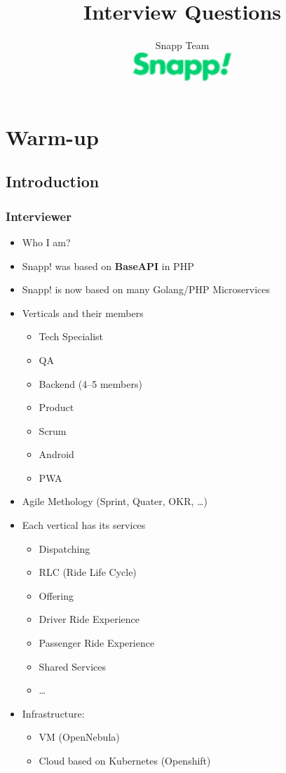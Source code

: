 \documentclass[]{book}
\begin{document}
\title{Interview Questions}
\author{%
  Snapp Team \\[1cm]
  \includegraphics[width=10em]{./snapp.png}
}

\maketitle

\chapter{Warm-up}

\section{Introduction}

\subsection{Interviewer}
\begin{itemize}
  \item Who I am?
  \item Snapp! was based on \textbf{BaseAPI} in PHP
  \item Snapp! is now based on many Golang/PHP Microservices
  \item Verticals and their members
    \begin{itemize}
      \item Tech Specialist
      \item QA
      \item Backend (4--5 members)
      \item Product
      \item Scrum
      \item Android
      \item PWA
    \end{itemize}
  \item Agile Methology (Sprint, Quater, OKR, \ldots)
  \item Each vertical has its services
    \begin{itemize}
      \item Dispatching
      \item RLC (Ride Life Cycle)
      \item Offering
      \item Driver Ride Experience
      \item Passenger Ride Experience
      \item Shared Services
      \item \ldots
    \end{itemize}
  \item Infrastructure:
    \begin{itemize}
      \item VM (OpenNebula)
      \item Cloud based on Kubernetes (Openshift)
    \end{itemize}
\end{itemize}
\end{document}
